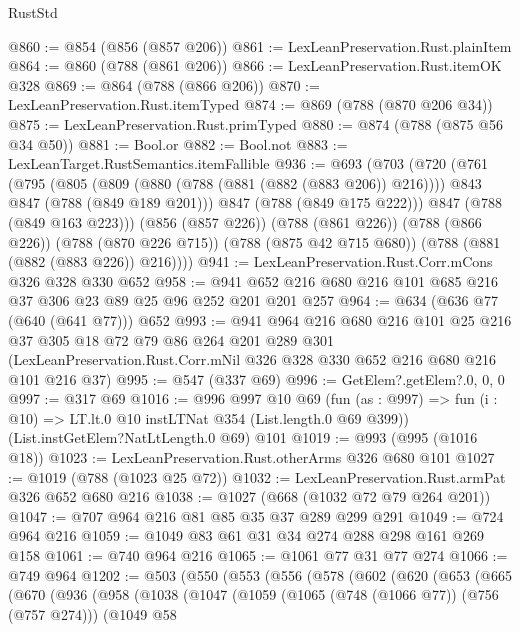 \begin{lexlean}{RustStd}
\begin{coremodule}
@860 := @854 (@856 (@857 @206))
@861 := LexLeanPreservation.Rust.plainItem
@864 := @860 (@788 (@861 @206))
@866 := LexLeanPreservation.Rust.itemOK @328
@869 := @864 (@788 (@866 @206))
@870 := LexLeanPreservation.Rust.itemTyped
@874 := @869 (@788 (@870 @206 @34))
@875 := LexLeanPreservation.Rust.primTyped
@880 := @874 (@788 (@875 @56 @34 @50))
@881 := Bool.or
@882 := Bool.not
@883 := LexLeanTarget.RustSemantics.itemFallible
@936 := @693
    (@703
      (@720
        (@761
          (@795
            (@805
              (@809 (@880 (@788 (@881 (@882 (@883 @206)) @216))))
              @843
              @847
              (@788 (@849 @189 @201)))
            @847
            (@788 (@849 @175 @222)))
          @847
          (@788 (@849 @163 @223)))
        (@856 (@857 @226))
        (@788 (@861 @226))
        (@788 (@866 @226))
        (@788 (@870 @226 @715))
        (@788 (@875 @42 @715 @680))
        (@788 (@881 (@882 (@883 @226)) @216))))
@941 := LexLeanPreservation.Rust.Corr.mCons @326 @328 @330 @652
@958 := @941 @652 @216 @680 @216 @101 @685 @216 @37 @306 @23 @89 @25 @96 @252 @201 @201 @257
@964 := @634 (@636 @77 (@640 (@641 @77))) @652
@993 := @941
    @964
    @216
    @680
    @216
    @101
    @25
    @216
    @37
    @305
    @18
    @72
    @79
    @86
    @264
    @201
    @289
    @301
    (LexLeanPreservation.Rust.Corr.mNil @326 @328 @330 @652 @216 @680 @216 @101 @216 @37)
@995 := @547 (@337 @69)
@996 := GetElem?.getElem?.{0, 0, 0}
@997 := @317 @69
@1016 := @996
    @997
    @10
    @69
    (fun (as : @997) => fun (i : @10) => LT.lt.{0} @10 instLTNat @354 (List.length.{0} @69 @399))
    (List.instGetElem?NatLtLength.{0} @69)
    @101
@1019 := @993 (@995 (@1016 @18))
@1023 := LexLeanPreservation.Rust.otherArms @326 @680 @101
@1027 := @1019 (@788 (@1023 @25 @72))
@1032 := LexLeanPreservation.Rust.armPat @326 @652 @680 @216
@1038 := @1027 (@668 (@1032 @72 @79 @264 @201))
@1047 := @707 @964 @216 @81 @85 @35 @37 @289 @299 @291
@1049 := @724 @964 @216
@1059 := @1049 @83 @61 @31 @34 @274 @288 @298 @161 @269 @158
@1061 := @740 @964 @216
@1065 := @1061 @77 @31 @77 @274
@1066 := @749 @964
@1202 := @503
    (@550
      (@553
        (@556
          (@578
            (@602
              (@620
                (@653
                  (@665
                    (@670
                      (@936
                        (@958
                          (@1038
                            (@1047
                              (@1059
                                (@1065 (@748 (@1066 @77)) (@756 (@757 @274)))
                                (@1049
                                  @58

\end{coremodule}
\end{lexlean}
